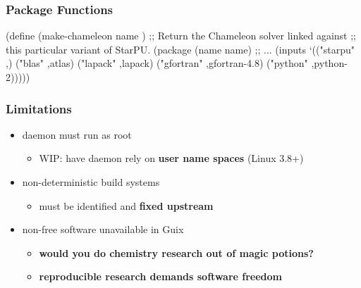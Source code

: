 \documentclass{beamer}
\begin{document}
\begin{frame}[fragile]
  \frametitle{Package Functions}

  \begin{semiverbatim}
\small{
  (define (\alert{make-chameleon} name )
     ;; Return the Chameleon solver linked against
     ;; this particular variant of StarPU.
     (\alert{package}
       (name name)
       ;; \textrm{...}
       (inputs `(("starpu" ,)
                 ("blas" ,atlas)
                 ("lapack" ,lapack)
                 ("gfortran" ,gfortran-4.8)
                 ("python" ,python-2)))))
}
  \end{semiverbatim}

\end{frame}

\begin{frame}[plain]
\end{frame}

\begin{frame}
  \frametitle{Limitations}

  \Large{
    \begin{itemize}
    \item{daemon must run as root
      \begin{itemize}
      \item<2-> WIP: have daemon rely on \textbf{user name spaces} (Linux
        3.8+)
    \end{itemize}}
    \item{non-deterministic build systems
      \begin{itemize}
      \item<3->must be identified and \textbf{fixed upstream}
    \end{itemize}}
    \item{non-free software unavailable in Guix
      \begin{itemize}
      \item<4-> \textbf<4>{would you do chemistry research out of magic
        potions?}
      \item<5-> \textbf{reproducible research demands software freedom}
    \end{itemize}}
    \end{itemize}
  }
\end{frame}
\end{document}
